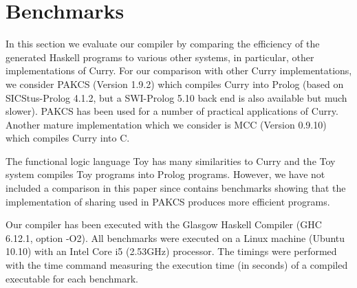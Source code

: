 \documentclass{llncs}
\begin{document}
\section{Benchmarks}
\label{sec:Benchmarks}

In this section we evaluate our compiler by comparing the
efficiency of the generated Haskell programs to various
other systems, in particular, other implementations of Curry.
For our comparison with other Curry implementations,
we consider PAKCS \cite{Hanus10PAKCS} (Version 1.9.2) which compiles
Curry into Prolog \cite{AntoyHanus00FROCOS}
(based on SICStus-Prolog 4.1.2, but a SWI-Prolog 5.10 back end is also
available
but much slower). PAKCS has been used for a number of practical
applications of Curry.
Another mature implementation which we consider is MCC \cite{Lux99FLOPS}
(Version 0.9.10) which compiles Curry into C.

The functional logic language Toy \cite{Lopez-FraguasSanchez-Hernandez99}
has many similarities to Curry and the Toy system compiles Toy programs
into Prolog programs. However, we have not included a comparison
in this paper since \cite{AntoyHanus00FROCOS} contains benchmarks
showing that the implementation of sharing used in PAKCS produces
more efficient programs.

Our compiler has been executed with the Glasgow Haskell Compiler
(GHC 6.12.1, option -O2). All benchmarks were executed on a Linux machine
(Ubuntu 10.10) with an Intel Core i5 (2.53GHz) processor.
The timings were performed with the time command measuring the
execution time (in seconds) of a compiled executable for each benchmark.
\end{document}
